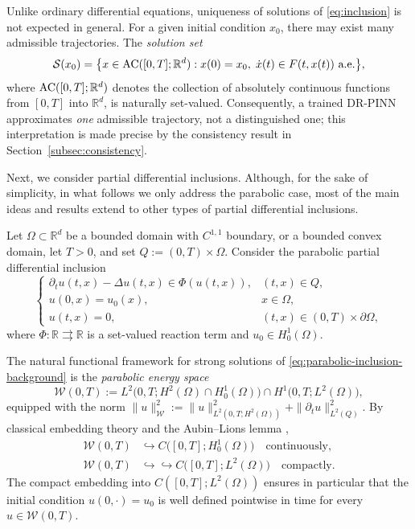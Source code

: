 \documentclass[11pt]{elsarticle}
\theoremstyle{definition}
\theoremstyle{remark}
\numberwithin{equation}{section}
\begin{document}
	Unlike ordinary differential equations, uniqueness of solutions of
	\eqref{eq:inclusion} is not expected in general.  For a given initial
	condition $x_0$, there may exist many admissible trajectories.  The
	\emph{solution set}
	\begin{equation}\label{eq:solution-DI}
		\mathcal{S}(x_0)
		=
		\bigl\{
		x\in {\rm AC}([0,T];\mathbb{R}^d):
		x(0)=x_0,\;
		\dot{x}(t)\in F(t,x(t))\ \text{a.e.}
		\bigr\},
	\end{equation}
	where ${\rm AC}([0,T];\mathbb{R}^d)$ denotes the collection of
	absolutely continuous functions from $[0,T]$ into $\mathbb{R}^d$,
	is naturally set-valued.  Consequently, a trained DR-PINN approximates
	\emph{one} admissible trajectory, not a distinguished one; this
	interpretation is made precise by the consistency result in
	Section~\ref{subsec:consistency}.

Next, we consider partial differential inclusions. Although, for the sake of simplicity, in what follows we only address the parabolic case, most of the main ideas and results extend to other types of partial differential inclusions. 

Let $\Omega\subset\mathbb{R}^d$ be a bounded domain with $C^{1,1}$ boundary, or a bounded convex domain, let $T>0$, and set
$Q:=(0,T)\times\Omega$.  Consider the parabolic partial differential
inclusion
\begin{equation}\label{eq:parabolic-inclusion-background}
	\left\{
	\begin{array}{ll}
		\partial_t u(t,x)-\Delta u(t,x)\in\Phi(u(t,x)), & (t,x)\in Q,\\[4pt]
		u(0,x)=u_0(x), & x\in\Omega,\\[4pt]
		u(t,x)=0, & (t,x)\in(0,T)\times\partial\Omega,
	\end{array}
	\right.
\end{equation}
where $\Phi:\mathbb{R}\rightrightarrows\mathbb{R}$ is a set-valued reaction
term and $u_0\in H_0^1(\Omega)$.

The natural functional framework for strong solutions of
\eqref{eq:parabolic-inclusion-background} is the \emph{parabolic energy
space}
\[
\mathcal{W}(0,T)
:=
L^2\bigl(0,T;H^2(\Omega)\cap H_0^1(\Omega)\bigr)
\cap
H^1\bigl(0,T;L^2(\Omega)\bigr),
\]
equipped with the norm
$\|u\|_{\mathcal{W}}^2:=\|u\|_{L^2(0,T;H^2(\Omega))}^2
+\|\partial_t u\|_{L^2(Q)}^2$.  By classical embedding theory and the
Aubin--Lions lemma \cite{LionsMagenes},
\begin{align*}
	\mathcal{W}(0,T)&\hookrightarrow C\bigl([0,T];H_0^1(\Omega)\bigr)
	\quad\text{continuously,}\\
	\mathcal{W}(0,T)&\hookrightarrow\hookrightarrow C\bigl([0,T];L^2(\Omega)\bigr)
	\quad\text{compactly.}
\end{align*}
The compact embedding into $C([0,T];L^2(\Omega))$ ensures in particular
that the initial condition $u(0,\cdot)=u_0$ is well defined pointwise in
time for every $u\in\mathcal{W}(0,T)$.
\end{document}
